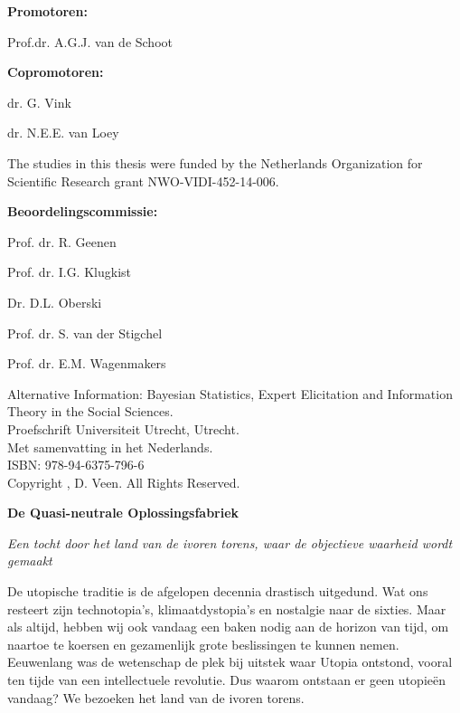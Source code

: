 \documentclass[openright,titlepage,12pt,a4paper]{book}
\begin{document}
\newpage

\pagestyle{empty}
\textbf{Promotoren:}


Prof.dr. A.G.J. van de Schoot

\textbf{Copromotoren:}

dr. G. Vink

dr. N.E.E. van Loey

\vspace*{\fill}

\noindent The studies in this thesis were funded by the Netherlands Organization for Scientific Research grant NWO-VIDI-452-14-006.

% 

\newpage


\textbf{Beoordelingscommissie:}

Prof. dr. R. Geenen

Prof. dr. I.G. Klugkist

Dr. D.L. Oberski 

Prof. dr. S. van der Stigchel

Prof. dr. E.M. Wagenmakers 

\vspace*{\fill}


\noindent Alternative Information: Bayesian Statistics, Expert Elicitation and Information Theory in the Social Sciences.\\
\noindent Proefschrift Universiteit Utrecht, Utrecht. \\
\noindent Met samenvatting in het Nederlands. \\

\noindent ISBN: 978-94-6375-796-6 \\
\noindent Copyright , D. Veen. All Rights Reserved.



\newpage

\textbf{De Quasi-neutrale Oplossingsfabriek}

\textit{Een tocht door het land van de ivoren torens, waar de objectieve waarheid wordt gemaakt}

De utopische traditie is de afgelopen decennia drastisch uitgedund. Wat ons resteert zijn technotopia's, klimaatdystopia's en nostalgie naar de sixties. Maar als altijd, hebben wij ook vandaag een baken nodig aan de horizon van tijd, om naartoe te koersen en gezamenlijk grote beslissingen te kunnen nemen. Eeuwenlang was de wetenschap de plek bij uitstek waar Utopia ontstond, vooral ten tijde van een intellectuele revolutie. Dus waarom ontstaan er geen utopieën vandaag? We bezoeken het land van de ivoren torens.
\end{document}
